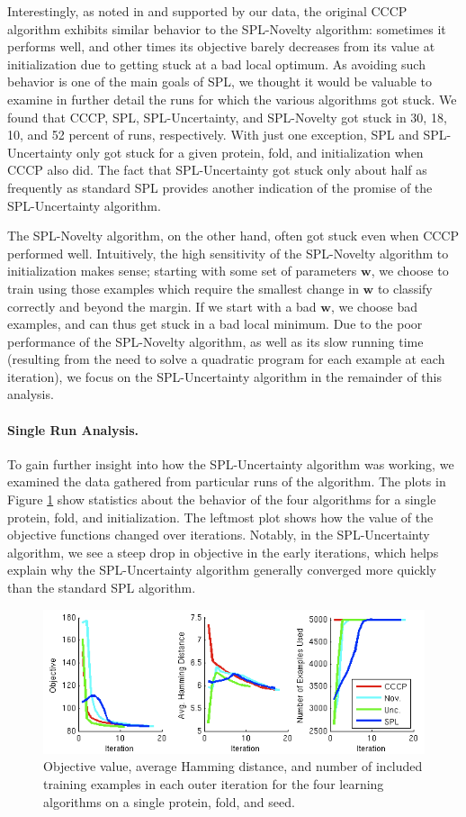 \documentclass{article}
\newcommand{\myparagraph}[1]{\vspace{-2mm}\paragraph{#1}}
\begin{document}
Interestingly, as noted in \cite{SPL} and supported by our data, the original CCCP algorithm exhibits similar behavior to the SPL-Novelty algorithm: sometimes it performs well, and other times its objective barely decreases from its value at initialization due to getting stuck at a bad local optimum. As avoiding such behavior is one of the main goals of SPL, we thought it would be valuable to examine in further detail the runs for which the various algorithms got stuck. We found that CCCP, SPL, SPL-Uncertainty, and SPL-Novelty got stuck in 30, 18, 10, and 52 percent of runs, respectively. With just one exception, SPL and SPL-Uncertainty only got stuck for a given protein, fold, and initialization when CCCP also did. The fact that SPL-Uncertainty got stuck only about half as frequently as standard SPL provides another indication of the promise of the SPL-Uncertainty algorithm. 

The SPL-Novelty algorithm, on the other hand, often got stuck even when CCCP performed well. Intuitively, the high sensitivity of the SPL-Novelty algorithm to initialization makes sense; starting with some set of parameters $\textbf{w}$, we choose to train using those examples which require the smallest change in $\textbf{w}$ to classify correctly and beyond the margin. If we start with a bad $\textbf{w}$, we choose bad examples, and can thus get stuck in a bad local minimum. Due to the poor performance of the SPL-Novelty algorithm, as well as its slow running time (resulting from the need to solve a quadratic program for each example at each iteration), we focus on the SPL-Uncertainty algorithm in the remainder of this analysis.

\myparagraph{Single Run Analysis.}  To gain further insight into how the SPL-Uncertainty algorithm was working, we examined the data gathered  from particular runs of the algorithm. The plots in Figure \ref{fig:exrun} show statistics about the behavior of the four algorithms for a single protein, fold, and initialization. The leftmost plot shows how the value of the objective functions changed over iterations. Notably, in the SPL-Uncertainty algorithm, we see a steep drop in objective in the early iterations, which helps explain why the SPL-Uncertainty algorithm generally converged more quickly than the standard SPL algorithm. 

\begin{figure}
\includegraphics[scale = 0.7]{ExampleMotifRun_WithNovelty_small2.png}
\caption{Objective value, average Hamming distance, and number of included training examples in each outer iteration for the four learning algorithms on a single protein, fold, and seed.}
\label{fig:exrun}
\end{figure}
\end{document}
